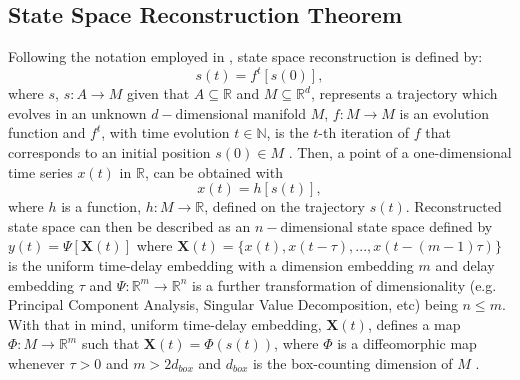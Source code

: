 \documentclass[fleqn,10pt]{wlscirep}
\begin{document}
\subsection*{State Space Reconstruction Theorem}
Following the notation employed in \cite{casdagli1991, garland2016, gibson1992,
uzal2011, uzal2010, takens1981}, state space reconstruction is defined by:
\begin{equation}\label{eq:ssr}
  s(t)=f^t [s(0)],
\end{equation}
where $s$, $s: A \rightarrow M$ given that $A \subseteq \mathbb{R}$ and 
$M \subseteq \mathbb{R}^d$, represents a trajectory which evolves in an 
unknown $d-$dimensional manifold $M$, $f: M \rightarrow M$ is an evolution 
function and $f^t$, with time evolution $t \in \mathbb{N}$, is the $t$-th 
iteration of $f$ that corresponds to an initial position 
$s(0) \in M $ \cite{takens1981}.
Then, a point of a one-dimensional time series $x(t)$ in $\mathbb{R}$, 
can be obtained with
\begin{equation}\label{eq:measurement}
  x(t)=h[s(t)],
\end{equation}
where $h$ is a function, $h: M \rightarrow \mathbb{R}$, defined on the trajectory $s(t)$.
Reconstructed state space can then be described as an $n-$dimensional state 
space defined by $y(t)=\Psi[\boldsymbol{X}(t)]$ where 
$\boldsymbol{X}(t) = \{ x(t), x(t-\tau) , ...,x(t - (m-1)\tau  ) \}$ 
is the uniform time-delay embedding with a dimension embedding $m$
and delay embedding $\tau$ and
$ \Psi: \mathbb{R}^m \rightarrow \mathbb{R}^n$ is a further transformation
of dimensionality (e.g. Principal Component Analysis, 
Singular Value Decomposition, etc) being $n \leq m$.
With that in mind, uniform time-delay embedding, $\boldsymbol{X}(t)$, 
defines a map $\Phi: M \rightarrow \mathbb{R}^m$ such that 
$\boldsymbol{X}(t) = \Phi(s(t))$,
where $\Phi$ is a diffeomorphic map \cite{takens1981}
whenever $\tau > 0$ and $m > 2d_{box}$ and $d_{box}$ is the box-counting
dimension of $M$ \cite{garland2016}.
\end{document}
